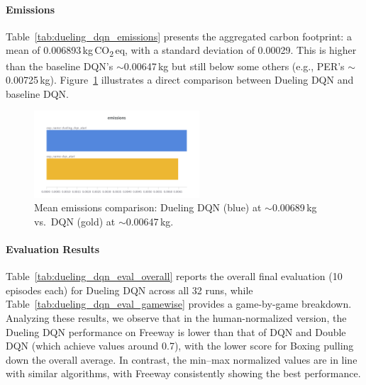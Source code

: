 \paragraph{Emissions}
Table~\ref{tab:dueling_dqn_emissions} presents the aggregated carbon footprint: 
a mean of \num{0.006893}\,kg\,CO\textsubscript{2}\,eq, with a standard deviation of \num{0.00029}. 
This is higher than the baseline DQN's $\sim$\num{0.00647}\,kg 
but still below some others (e.g., PER's $\sim$\num{0.00725}\,kg). 
Figure~\ref{fig:dueling_emissions_barplot} illustrates a direct comparison 
between Dueling DQN and baseline DQN.

\begin{table}
	\caption{Carbon emissions (kg\,CO\textsubscript{2}\,eq) for Dueling DQN across 32 runs.}
	\label{tab:dueling_dqn_emissions}
	\centering
\end{table}

\begin{figure}
	\centering
	\includegraphics[width=0.55\textwidth]{figures/dueling_dqn/emissions_dqn_dueling.png}
	\caption{Mean emissions comparison: Dueling DQN (blue) at $\sim$\num{0.00689}\,kg vs.\ DQN (gold) at $\sim$\num{0.00647}\,kg.}
	\label{fig:dueling_emissions_barplot}
\end{figure}

\paragraph{Evaluation Results}
Table~\ref{tab:dueling_dqn_eval_overall} reports the overall final evaluation (10 episodes each) for Dueling DQN across all 32 runs, while Table~\ref{tab:dueling_dqn_eval_gamewise} provides a game-by-game breakdown.
Analyzing these results, we observe that in the human-normalized version, the Dueling DQN performance on Freeway is lower than that of DQN and Double DQN (which achieve values around 0.7), with the lower score for Boxing pulling down the overall average. In contrast, the min–max normalized values are in line with similar algorithms, with Freeway consistently showing the best performance.

